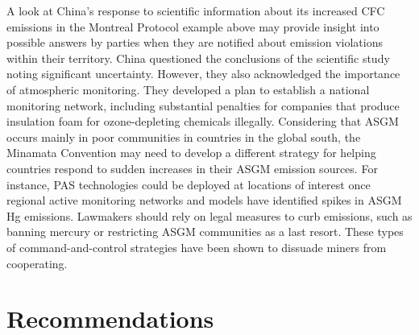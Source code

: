 \begin{flushleft}
A look at China's response to scientific information about its increased CFC emissions in the Montreal Protocol example above may provide insight into possible answers by parties when they are notified about emission violations within their territory. China questioned the conclusions of the scientific study noting significant uncertainty. However, they also acknowledged the importance of atmospheric monitoring. They developed a plan to establish a national monitoring network, including substantial penalties for companies that produce insulation foam for ozone-depleting chemicals illegally. Considering that ASGM occurs mainly in poor communities in countries in the global south, the Minamata Convention may need to develop a different strategy for helping countries respond to sudden increases in their ASGM emission sources. For instance, PAS technologies could be deployed at locations of interest once regional active monitoring networks and models have identified spikes in ASGM Hg emissions. Lawmakers should rely on legal measures to curb emissions, such as banning mercury or restricting ASGM communities as a last resort. These types of command-and-control strategies have been shown to dissuade miners from cooperating.
\end{flushleft}




\section{Recommendations}


